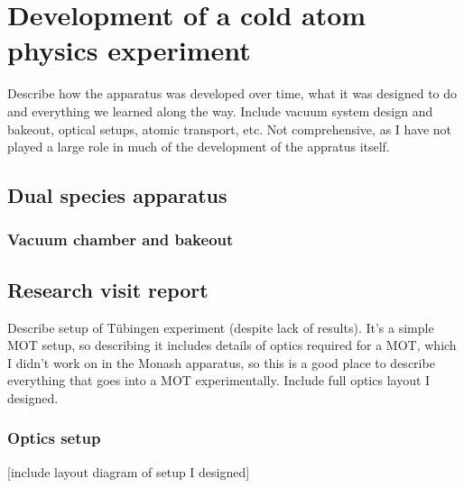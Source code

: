 
\chapter{Development of a cold atom physics experiment}

Describe how the apparatus was developed over time, what it was designed to do and everything we learned along the way. Include vacuum system design and bakeout, optical setups, atomic transport, etc. Not comprehensive, as I have not played a large role in much of the development of the appratus itself.

\section{Dual species apparatus}
    \subsection{Vacuum chamber and bakeout}
\section{Research visit report}
    Describe setup of Tübingen experiment (despite lack of results). It's a simple MOT setup, so describing it includes details of optics required for a MOT, which I didn't work on in the Monash apparatus, so this is a good place to describe everything that goes into a MOT experimentally. Include full optics layout I designed.
    \subsection{Optics setup}
    [include layout diagram of setup I designed]
